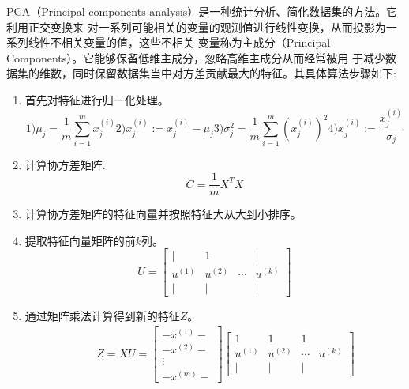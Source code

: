 PCA（Principal components analysis）是一种统计分析、简化数据集的方法。它利用正交变换来
对一系列可能相关的变量的观测值进行线性变换，从而投影为一系列线性不相关变量的值，这些不相关
变量称为主成分（Principal Components）。它能够保留低维主成分，忽略高维主成分从而经常被用
于减少数据集的维数，同时保留数据集当中对方差贡献最大的特征。其具体算法步骤如下:
\begin{enumerate}
    \item 首先对特征进行归一化处理。\begin{equation}
        1)  \mu_{j}=\frac{1}{m} \sum_{i=1}^{m} x_{j}^{(i)} 
        2)  x_{j}^{(i)}:=x_{j}^{(i)}-\mu_{j} 
        3)  \sigma_{j}^{2}=\frac{1}{m} \sum_{i=1}^{m}\left(x_{j}^{(i)}\right)^{2} 
        4)  x_{j}^{(i)}:=\frac{x_{j}^{(i)}}{\sigma_{j}} 
    \end{equation}
    \item 计算协方差矩阵.\begin{equation}
        C=\frac{1}{m} X^{T} X
    \end{equation}
    \item 计算协方差矩阵的特征向量并按照特征大从大到小排序。
    \item 提取特征向量矩阵的前$k$列。\begin{equation}
        U=\left[\begin{array}{cccc}
            \mid & 1 & & \mid \\
            u^{(1)} & u^{(2)} & \cdots & u^{(k)} \\
            \mid & \mid & & \mid
            \end{array}\right]
    \end{equation}
    \item 通过矩阵乘法计算得到新的特征$Z$。\begin{equation}
        \begin{array}{l}
            \qquad Z=X U=\left[\begin{array}{c}
            -x^{(1)}- \\
            -x^{(2)}- \\
            \vdots \\
            -x^{(m)}-
            \end{array}\right]\left[\begin{array}{cccc}
            1 & 1 & 1 \\
            u^{(1)} & u^{(2)} & \cdots & u^{(k)} \\
            \mid & \mid & \mid
            \end{array}\right] \\
            
            \end{array}
    \end{equation}
\end{enumerate}
